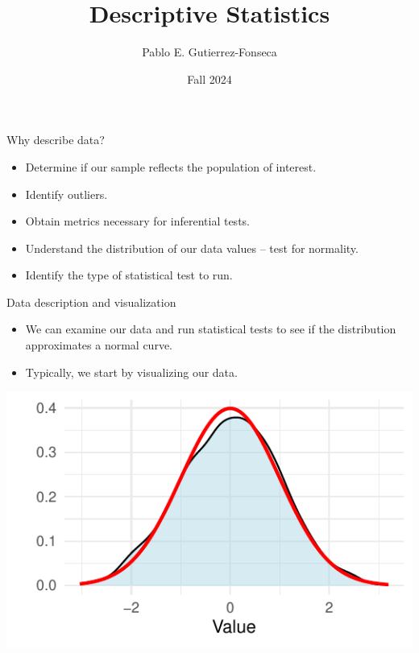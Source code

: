 \documentclass[
  ignorenonframetext,
]{beamer}
\title{Descriptive Statistics}
\author{Pablo E. Gutierrez-Fonseca}
\date{Fall 2024}
\providecommand{\tightlist}{%
  \setlength{\itemsep}{0pt}\setlength{\parskip}{0pt}}
\begin{document}
\frame{\titlepage}

\begin{frame}{Why describe data?}
\label{why-describe-data}
\begin{itemize}
\tightlist
\item
  Determine if our sample reflects the population of interest.
\end{itemize}

\begin{itemize}
\tightlist
\item
  Identify outliers.
\end{itemize}

\begin{itemize}
\tightlist
\item
  Obtain metrics necessary for inferential tests.
\end{itemize}

\begin{itemize}
\tightlist
\item
  Understand the distribution of our data values -- test for normality.
\end{itemize}

\begin{itemize}
\tightlist
\item
  Identify the type of statistical test to run.
\end{itemize}
\end{frame}

\begin{frame}{Data description and visualization}
\label{data-description-and-visualization}
\begin{itemize}
\tightlist
\item
  We can examine our data and run statistical tests to see if the
  distribution approximates a normal curve.\\
\item
  Typically, we start by visualizing our data.
\end{itemize}

\includegraphics{M4-Descriptice-Statistics_files/figure-beamer/unnamed-chunk-1-1.pdf}
\end{frame}
\end{document}
